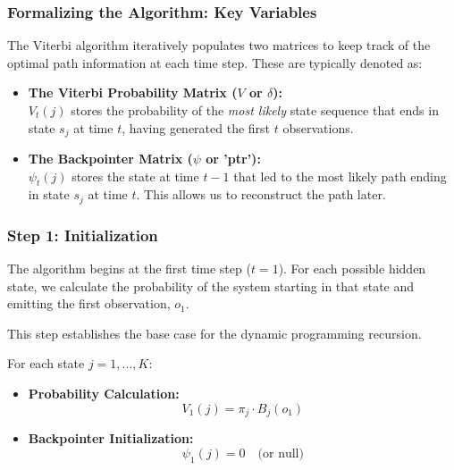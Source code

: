 \documentclass[aspectratio=43, 9pt]{beamer}
\begin{document}
\begin{frame}
    \frametitle{Formalizing the Algorithm: Key Variables}
    The Viterbi algorithm iteratively populates two matrices to keep track of the optimal path information at each time step. These are typically denoted as:
    
    \vspace{1em}
    
    \begin{NewDefinition}
        \begin{itemize}
            \item \textbf{The Viterbi Probability Matrix ($V$ or $\delta$):} \\
            $V_t(j)$ stores the probability of the \textit{most likely} state sequence that ends in state $s_j$ at time $t$, having generated the first $t$ observations.
            
            \vspace{1em}
            
            \item \textbf{The Backpointer Matrix ($\psi$ or 'ptr'):} \\
            $\psi_t(j)$ stores the state at time $t-1$ that led to the most likely path ending in state $s_j$ at time $t$. This allows us to reconstruct the path later.
        \end{itemize}
    \end{NewDefinition}
\end{frame}

\begin{frame}
    \frametitle{Step 1: Initialization}
    The algorithm begins at the first time step ($t=1$). For each possible hidden state, we calculate the probability of the system starting in that state and emitting the first observation, $o_1$.
    
    \vspace{1em}
    
    This step establishes the base case for the dynamic programming recursion.
    
    \begin{NewTheorem}
        For each state $j = 1,..., K$:
        \begin{itemize}
            \item \textbf{Probability Calculation:}
            $$V_1(j) = \pi_j \cdot B_j(o_1)$$
            
            \item \textbf{Backpointer Initialization:}
            $$\psi_1(j) = 0 \quad \text{(or null)}$$
        \end{itemize}
    \end{NewTheorem}
\end{frame}
\end{document}

